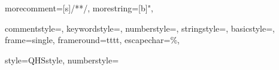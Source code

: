 \usepackage[ngerman]{babel}

\usepackage{fontspec}

\renewcommand{\familydefault}{\sfdefault}

\usepackage{graphicx}

\usepackage{setspace}

\usepackage{csquotes}

\usepackage{scrlayer-scrpage}


%

\usepackage{lipsum}

\usepackage{listings}
\renewcommand{\lstlistingname}{Auflistung}
\renewcommand{\lstlistlistingname}{Auflistungsverzeichnis}
\usepackage{xcolor}
\newcommand*{\listingFont}{\ttfamily}
\newcommand*{\selectListingFont}{\listingFont\selectfont}
{
    morecomment=[s]{/*}{*/}, %
    morestring=[b]", %
}

{
    commentstyle=\color{codegreen},
    keywordstyle=\color{codeviolet},
    numberstyle=\tiny\color{codegray},
    stringstyle=\color{codebrown},
    basicstyle=\listingFont\footnotesize,
    frame=single,
    frameround=tttt,
    escapechar=\%,
}

\lstset
{
    style=QHSstyle,
    numberstyle=\listingFont
}

\newcommand*{\ruleEingabe}{\noindent\hrulefill { }Eingabe \noindent\hrulefill}
\newcommand*{\ruleAusgabe}{\noindent\hrulefill { }Ausgabe \noindent\hrulefill}


\usepackage{float}

\usepackage{tabularx}

\usepackage{pgfplots}

\usepackage{multicol}
\setlength\columnsep{20pt} %

\usepackage{url}



